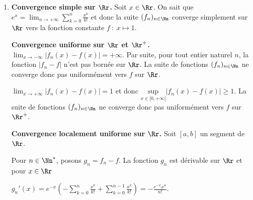 {{\begin{enumerate}
Puisque la fonction $f_n$ est positive sur $\Rr^+$,  $\underset{x\in\Rr}{\text{sup}}|f_n(x) - 0|= f_n\left(\frac{1}{n}\right)=\frac{1}{2}$ qui ne tend pas vers $0$ quand $n$ tend vers l'infini.

\textbf{Convergence uniforme et localement uniforme sur $]0,+\infty[$.}
La suite de fonctions $(f_n)_{n\in\Nn}$ ne converge toujours pas uniformément vers la fonction nulle sur $]0,+\infty[$ car pour $n\geqslant1$, $\underset{x\in\Rr}{\text{sup}}|f_n(x) - 0|=\frac{1}{2}$.

 
Soit $a$ un réel strictement positif fixé. Soit $n>\frac{1}{a}$. On a $0<\frac{1}{n}<a$ et donc  la fonction $f_n$ est décroissante sur $[a,+\infty[$. Par suite, pour tout réel $x$ de $[a,+\infty[$, $0\leqslant f_n(x)\leqslant f_n(a)$.

Donc $\underset{x\in[a,+\infty[}{\text{sup}}|f_n(x) - 0|= fn(a)$ pour $n>\frac{1}{a}$. On en déduit que  $\lim_{n \rightarrow +\infty}\underset{x\in[a,+\infty[}{\text{sup}}|f_n(x) - 0|=0$.
Donc la suite de fonctions $(f_n)_{n\in\Nn}$ converge uniformément vers la fonction nulle sur tout intervalle de la forme $[a,+\infty[$ où $a > 0$ et en particulier converge localement uniformément vers la fonction nulle sur $]0,+\infty[$ mais ne converge pas uniformément vers la fonction nulle sur $]0,+\infty[$. 

\item  \textbf{Convergence simple sur $\Rr$.} Soit $x\in\Rr$. On sait que $e^x =\lim_{n \rightarrow +\infty}\sum_{k=0}^{n}\frac{x^k}{k!}$ et donc la suite $(f_n)_{n\in\Nn}$ converge simplement sur $\Rr$ vers la fonction constante $f~:~x\mapsto1$.

\textbf{Convergence uniforme sur $\Rr$ et $\Rr^+$.} $\lim_{x \rightarrow -\infty}|f_n(x)-f(x)| = +\infty$. Par suite, pour tout entier naturel $n$, la fonction $|f_n-f|$ n'est pas bornée sur $\Rr$. La suite de fonctions $(f_n)_{n\in\Nn}$ ne converge donc pas uniformément vers $f$ sur $\Rr$.

$\lim_{x \rightarrow +\infty}|f_n(x)-f(x)| = 1$ et donc $\underset{x\in[0,+\infty[}{\text{sup}}|f_n(x)-f(x)|\geqslant1$. La suite de fonctions $(f_n)_{n\in\Nn}$ ne converge donc pas uniformément vers $f$ sur $\Rr^+$.

\textbf{Convergence localement uniforme sur $\Rr$.} Soit $[a,b]$ un segment de $\Rr$.

 
Pour $n\in\Nn^*$, posons $g_n= f_n- f$. La fonction $g_n$ est dérivable sur $\Rr$ et pour $x\in\Rr$

\begin{center}
$g_n'(x)=e^{-x}\left(-\sum_{k=0}^{n}\frac{x^k}{k!}+\sum_{k=0}^{n-1}\frac{x^k}{k!}\right)=-\frac{e^{-x}x^n}{n!}$.
\end{center}


\end{enumerate}}}
